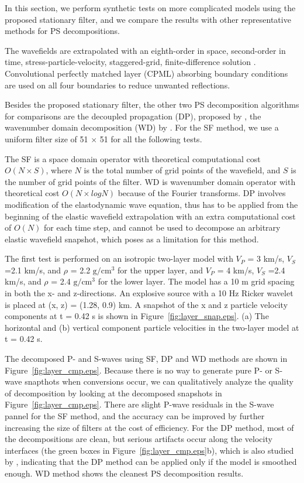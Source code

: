 \documentclass[manuscript,ulem,graphix,revised]{geophysics}
\begin{document}
In this section, we perform synthetic tests on more complicated models using the proposed stationary filter, and we compare the results with other representative methods for PS decompositions. 

The wavefields are extrapolated with an eighth-order in space, second-order in time, stress-particle-velocity, staggered-grid, finite-difference solution \citep{virieux86}. Convolutional perfectly matched layer (CPML) absorbing boundary conditions \citep{komatitsch07} are used on all four boundaries to reduce unwanted reflections. 

Besides the proposed stationary filter, the other two PS decomposition algorithms for comparisons are the decoupled propagation (DP), proposed by \citet{ma03}, the wavenumber domain decomposition (WD) by \citet{zhang10}. For the SF method, we use a uniform filter size of 51 $\times$ 51 for all the following tests. 

The SF is a space domain operator with theoretical computational cost $O(N \times S)$, where $N$ is the total number of grid points of the wavefield, and $S$ is the number of grid points of the filter. WD is wavenumber domain operator with theoretical cost $O(N \times logN)$ because of the Fourier transforms. DP involves modification of the elastodynamic wave equation, thus has to be applied from the beginning of the elastic wavefield extrapolation with an extra computational cost of $O(N)$ for each time step, and cannot be used to decompose an arbitrary elastic wavefield snapshot, which poses as a limitation for this method.

The first test is performed on an isotropic two-layer model with $V_P$ = 3 km/s, $V_S$ =2.1 km/s, and $\rho$ = 2.2 $\mathrm{g/cm^3}$ for the upper layer, and $V_P$ = 4 km/s, $V_S$ =2.4 km/s, and $\rho$ = 2.4 $\mathrm{g/cm^3}$ for the lower layer. 
The model has a 10 m grid spacing in both the x- and z-directions. An explosive source with a 10 Hz Ricker wavelet is placed at (x, z) = (1.28, 0.9) km. A snapshot of the x and z particle velocity components at t = 0.42 s is shown in Figure~\ref{fig:layer_snap.eps}.
{
(a) The horizontal and (b) vertical component particle velocities in the two-layer model at t = 0.42 s.
}

The decomposed P- and S-waves using SF, DP and WD methods are shown in Figure~\ref{fig:layer_cmp.eps}. Because there is no way to generate pure P- or S-wave snapthots when conversions occur, we can qualitatively analyze the quality of decomposition by looking at the decomposed snapshots in Figure~\ref{fig:layer_cmp.eps}. There are slight P-wave residuals in the S-wave pannel for the SF method, and the accuracy can be improved by further increasing the size of filters at the cost of efficiency. For the DP method, most of the decompositions are clean, but serious artifacts occur along the velocity interfaces (the green boxes in Figure~\ref{fig:layer_cmp.eps}b), which is also studied by \citet{wenlong_cmp15}, indicating that the DP method can be applied only if the model is smoothed enough. WD method shows the cleanest PS decomposition results. 
\end{document}
